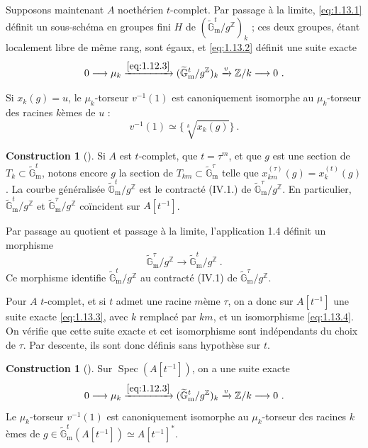 \documentclass[12pt,a4paper]{amsart}
\theoremstyle{plain}
\theoremstyle{definition}
\newtheorem{construction}[proposition]{Construction}
\theoremstyle{remark}
\DeclareMathOperator{\Spec}{Spec}
\newcommand{\ZZ}{\mathbb{Z}}
\newcommand{\Gmtilde}{\widetilde{\mathbb{G}}_\mathrm{m}}
\begin{document}
Supposons maintenant $A$ noeth\'erien $t$-complet. Par passage \`a la limite, \eqref{eq:1.13.1} d\'efinit un sous-sch\'ema en groupes fini $H$ de $(\Gmtilde^t / g^{\ZZ})_k$ ; ces deux groupes, \'etant localement libre de m\^eme rang, sont \'egaux, et \eqref{eq:1.13.2} d\'efinit une suite exacte
\begin{equation}\label{eq:1.13.3}
0 \longrightarrow \mu_k \xrightarrow{\eqref{eq:1.12.3}} (\Gmtilde^t / g^{\ZZ})_k \xrightarrow{v} \ZZ/k \longrightarrow 0 \ .
\end{equation}

Si $x_k(g) = u$, le $\mu_k$-torseur $v^{-1}(1)$ est canoniquement isomorphe au $\mu_k$-torseur des racines $k$\`emes de $u$ :
\begin{equation}\label{eq:1.13.4}
v^{-1}(1) \simeq \{\sqrt[k]{x_k(g)}\} \ .
\end{equation}

\begin{construction}[\theproposition]
Si $A$ est $t$-complet, que $t = \tau^m$, et que $g$ est une section de $T_k \subset \Gmtilde^t$, notons encore $g$ la section de $T_{km} \subset \Gmtilde^{\tau}$ telle que $x_{km}^{(\tau)}(g) = x_k^{(t)}(g)$. La courbe g\'en\'eralis\'ee $\Gmtilde^t / g^{\ZZ}$ est le contract\'e (IV.1.) de $\Gmtilde^{\tau} / g^{\ZZ}$. En particulier, $\Gmtilde^t / g^{\ZZ}$ et $\Gmtilde^{\tau} / g^{\ZZ}$ co\"incident sur $A[t^{-1}]$.

Par passage au quotient et passage \`a la limite, l'application 1.4 d\'efinit un morphisme
\[
\Gmtilde^{\tau} / g^{\ZZ} \longrightarrow \Gmtilde^t / g^{\ZZ} \ .
\]
Ce morphisme identifie $\Gmtilde^t / g^{\ZZ}$ au contract\'e (IV.1) de $\Gmtilde^{\tau} / g^{\ZZ}$.

Pour $A$ $t$-complet, et si $t$ admet une racine $m$\`eme $\tau$, on a donc sur $A[t^{-1}]$ une suite exacte \eqref{eq:1.13.3}, avec $k$ remplac\'e par $km$, et un isomorphisme \eqref{eq:1.13.4}. On v\'erifie que cette suite exacte et cet isomorphisme sont ind\'ependants du choix de $\tau$. Par descente, ils sont donc d\'efinis sans hypoth\`ese sur $t$.
\end{construction}

\begin{construction}[\theproposition]
Sur $\Spec(A[t^{-1}])$, on a une suite exacte
\[
0 \longrightarrow \mu_k \xrightarrow{\eqref{eq:1.12.3}} (\Gmtilde^t / g^{\ZZ})_k \xrightarrow{v} \ZZ/k \longrightarrow 0 \ .
\]
Le $\mu_k$-torseur $v^{-1}(1)$ est canoniquement isomorphe au $\mu_k$-torseur des racines $k$\`emes de $g \in \Gmtilde^t(A[t^{-1}]) \simeq A[t^{-1}]^*$.
\end{construction}
\end{document}
